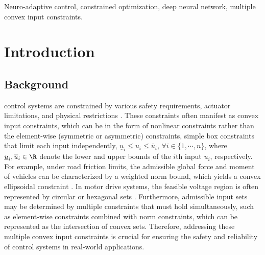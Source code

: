 \documentclass[letterpaper, journal]{IEEEtran}
\providecommand{\DIFdelbegin}{} %
\providecommand{\DIFdelend}{} %
\begin{document}
\begin{IEEEkeywords}
  Neuro-adaptive control, constrained optimization, deep neural network,  multiple convex input constraints.
\end{IEEEkeywords}

\section{Introduction}

\subsection{Background}

 control systems are constrained by various safety requirements, actuator limitations, and physical restrictions \cite{Ji:2025aa}.
These constraints often manifest as convex input constraints, which can be in the form of nonlinear constraints rather than the element-wise (symmetric or asymmetric) constraints, \ie 
simple box constraints that limit each input independently, \ie $\underline{u}_i\le u_i\le\overline{u}_i$, $\forall i\in\{1,\cdots,n\}$, where $\underline{u}_i,\overline{u}_i\in\R$ denote the lower and upper bounds of the $i$th input $u_i$, respectively.
\DIFdelbegin %
\DIFdelend For example, under road friction limits, the admissible global force and moment of vehicles can be characterized by a weighted norm bound, which yields a convex ellipsoidal constraint \cite{Chen:2024aa}.
In motor drive systems, the feasible voltage region is often represented by circular \cite{Ryu:2025aa} or hexagonal sets \cite{Monzen:2026aa}.
Furthermore, admissible input sets may be determined by multiple constraints that must hold simultaneously, such as element-wise constraints combined with norm constraints, which can be represented as the intersection of convex sets.
Therefore, addressing these multiple convex input constraints is crucial for ensuring the safety and reliability of control systems in real-world applications.
\end{document}
